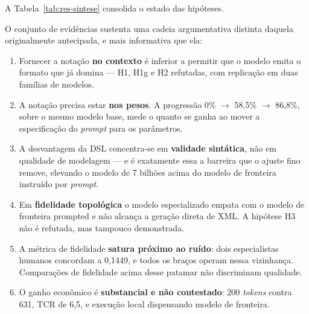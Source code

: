 A Tabela~\ref{tab:res-sintese} consolida o estado das hipóteses.

\begin{table}[h!]
\end{table}

O conjunto de evidências sustenta uma cadeia argumentativa distinta daquela originalmente antecipada, e mais informativa que ela:

\begin{enumerate}
	\item Fornecer a notação \textbf{no contexto} é inferior a permitir que o modelo emita o formato que já domina --- H1, H1g e H2 refutadas, com replicação em duas famílias de modelos.
	\item A notação precisa estar \textbf{nos pesos}. A progressão 0\% $\rightarrow$ 58,5\% $\rightarrow$ 86,8\%, sobre o mesmo modelo base, mede o quanto se ganha ao mover a especificação do \textit{prompt} para os parâmetros.
	\item A desvantagem da DSL concentra-se em \textbf{validade sintática}, não em qualidade de modelagem --- e é exatamente essa a barreira que o ajuste fino remove, elevando o modelo de 7 bilhões acima do modelo de fronteira instruído por \textit{prompt}.
	\item Em \textbf{fidelidade topológica} o modelo especializado empata com o modelo de fronteira prompted e não alcança a geração direta de XML. A hipótese H3 não é refutada, mas tampouco demonstrada.
	\item A métrica de fidelidade \textbf{satura próximo ao ruído}: dois especialistas humanos concordam a 0,1449, e todos os braços operam nessa vizinhança. Comparações de fidelidade acima desse patamar não discriminam qualidade.
	\item O ganho econômico é \textbf{substancial e não contestado}: 200 \textit{tokens} contra 631, TCR de 6,5, e execução local dispensando modelo de fronteira.
\end{enumerate}

